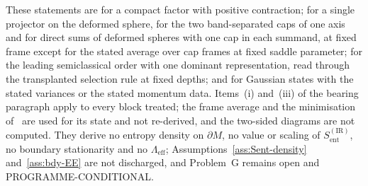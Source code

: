 These statements are for a compact factor with positive contraction; for a single projector on the deformed sphere, for the two band-separated caps of one axis and for direct sums of deformed spheres with one cap in each summand, at fixed frame except for the stated average over cap frames at fixed saddle parameter; for the leading semiclassical order with one dominant representation, read through the transplanted selection rule at fixed depths; and for Gaussian states with the stated variances or the stated momentum data. Items~(i) and~(iii) of the bearing paragraph apply to every block treated; the frame average and the minimisation of~\cite{FlissFrenkelHartnollSoni2025} are used for its state and not re-derived, and the two-sided diagrams are not computed. They derive no entropy density on \(\partial M\), no value or scaling of \(S_{\mathrm{ent}}^{\mathrm{(IR)}}\), no boundary stationarity and no \(\Lambda_{\mathrm{eff}}\); Assumptions~\ref{ass:Sent-density} and~\ref{ass:bdy-EE} are not discharged, and Problem~G remains open and PROGRAMME-CONDITIONAL.
